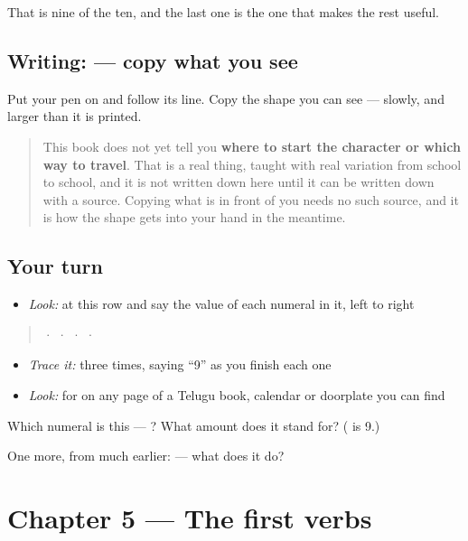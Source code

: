 That is nine of the ten, and the last one is the one that makes the rest useful.

\subsection*{Writing:  — copy what you see}
Put your pen on  and follow its line. Copy the shape you can see — slowly, and larger than it is printed.

\begin{quote}
This book does not yet tell you \textbf{where to start the character or which way to travel}. That is a real thing, taught with real variation from school to school, and it is not written down here until it can be written down with a source. Copying what is in front of you needs no such source, and it is how the shape gets into your hand in the meantime.
\end{quote}

\subsection*{Your turn}
\begin{itemize}
\raggedright
  \item \emph{Look:} at this row and say the value of each numeral in it, left to right
\end{itemize}

\begin{quote}
  ·    ·    ·    ·  
\end{quote}

\begin{itemize}
\raggedright
  \item \emph{Trace it:}  three times, saying \textquotedblleft{}9\textquotedblright{} as you finish each one
  \item \emph{Look:} for  on any page of a Telugu book, calendar or doorplate you can find
\end{itemize}

\begin{tcolorbox}[breakable,colback=teal!4,colframe=teal!35!black,title={Before you move on}]
Which numeral is this — ? What amount does it stand for? ( is 9.)

One more, from much earlier:  — what does it do?
\end{tcolorbox}
\section[Practice]{Chapter 5 — The first verbs}

